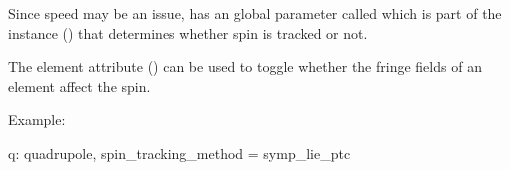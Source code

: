 Since speed may be an issue, \bmad has an global parameter called  which is
part of the  instance () that determines whether spin is tracked or
not. 

The  element attribute () can be used to toggle whether the
fringe fields of an element affect the spin.

Example:
\begin{example}
  q: quadrupole, spin_tracking_method = symp_lie_ptc
\end{example}


